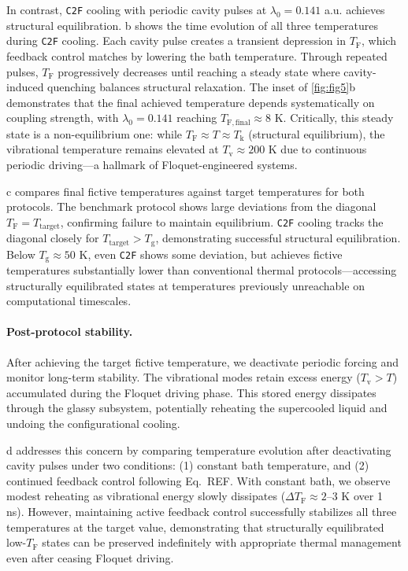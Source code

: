 \documentclass[%
 reprint,
 amsmath,amssymb,
 aps,
]{revtex4-2}
\begin{document}
In contrast, \texttt{C2F} cooling with periodic cavity pulses at $\lambda_0 = 0.141$ a.u. achieves structural equilibration. b shows the time evolution of all three temperatures during \texttt{C2F} cooling. Each cavity pulse creates a transient depression in $T_\mathrm{F}$, which feedback control matches by lowering the bath temperature. Through repeated pulses, $T_\mathrm{F}$ progressively decreases until reaching a steady state where cavity-induced quenching balances structural relaxation. The inset of \cref{fig:fig5}b demonstrates that the final achieved temperature depends systematically on coupling strength, with $\lambda_0 = 0.141$ reaching $T_\mathrm{F,final} \approx 8$ K. Critically, this steady state is a non-equilibrium one: while $T_\mathrm{F} \approx T \approx T_\mathrm{k}$ (structural equilibrium), the vibrational temperature remains elevated at $T_\mathrm{v} \approx 200$ K due to continuous periodic driving—a hallmark of Floquet-engineered systems.

c compares final fictive temperatures against target temperatures for both protocols. The benchmark protocol shows large deviations from the diagonal $T_\mathrm{F} = T_\mathrm{target}$, confirming failure to maintain equilibrium. \texttt{C2F} cooling tracks the diagonal closely for $T_\mathrm{target} > T_\mathrm{g}$, demonstrating successful structural equilibration. Below $T_\mathrm{g} \approx 50$ K, even \texttt{C2F} shows some deviation, but achieves fictive temperatures substantially lower than conventional thermal protocols---accessing structurally equilibrated states at temperatures previously unreachable on computational timescales.


\paragraph*{Post-protocol stability.} After achieving the target fictive temperature, we deactivate periodic forcing and monitor long-term stability. The vibrational modes retain excess energy ($T_\mathrm{v} > T$) accumulated during the Floquet driving phase. This stored energy dissipates through the glassy subsystem, potentially reheating the supercooled liquid and undoing the configurational cooling. 


d addresses this concern by comparing temperature evolution after deactivating cavity pulses under two conditions: (1) constant bath temperature, and (2) continued feedback control following Eq.~REF. With constant bath, we observe modest reheating as vibrational energy slowly dissipates ($\Delta T_\mathrm{F} \approx 2$--3 K over 1 ns). However, maintaining active feedback control successfully stabilizes all three temperatures at the target value, demonstrating that structurally equilibrated low-$T_\mathrm{F}$ states can be preserved indefinitely with appropriate thermal management even after ceasing Floquet driving.
\end{document}
